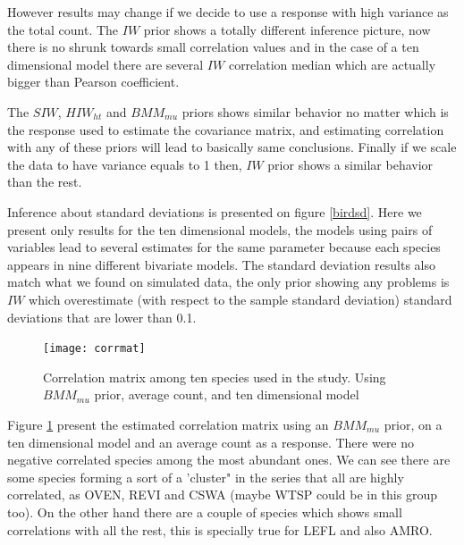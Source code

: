 \documentclass{article}
\begin{document}
However results may change if we decide to use a response with high variance as the total count. The $IW$ prior shows a totally different inference picture, now there is no shrunk towards small correlation values and in the case of a ten dimensional model there are several $IW$ correlation median which are actually bigger than Pearson coefficient. 

The $SIW$, $HIW_{ht}$ and $BMM_{mu}$ priors shows similar behavior no matter which is the response used to estimate the covariance matrix, and estimating correlation with any of these priors will lead to basically same conclusions. Finally if we scale the data to have variance equals to 1 then, $IW$ prior shows a similar behavior than the rest.

Inference about standard deviations is presented on figure \ref{birdsd}. Here we present only results for the ten dimensional models, the models using pairs of variables lead to several estimates for the same parameter because each species appears in nine different bivariate models. The standard deviation results also match what we found on simulated data, the only prior showing any problems is $IW$ which overestimate (with respect to the sample standard deviation) standard deviations that are lower than 0.1. 

\begin{figure}[hbpt]
\centering
\texttt{[image: corrmat]}
 \vspace{-.5in}
\caption{Correlation matrix among ten species used in the study. Using $BMM_{mu}$ prior, average count, and ten dimensional model \label{fig:mat}}
\end{figure}

Figure \ref{fig:mat} present the estimated correlation matrix using an $BMM_{mu}$ prior, on a ten dimensional model and an average count as a response. There were no negative correlated species among the most abundant ones. We can see there are some species forming a sort of a 'cluster" in the series that all are highly correlated, as  OVEN, REVI and CSWA (maybe WTSP could be in this group too).  On the other hand there are a couple of species which shows small correlations with all the rest, this is specially true for LEFL and also AMRO.  

\end{document}
